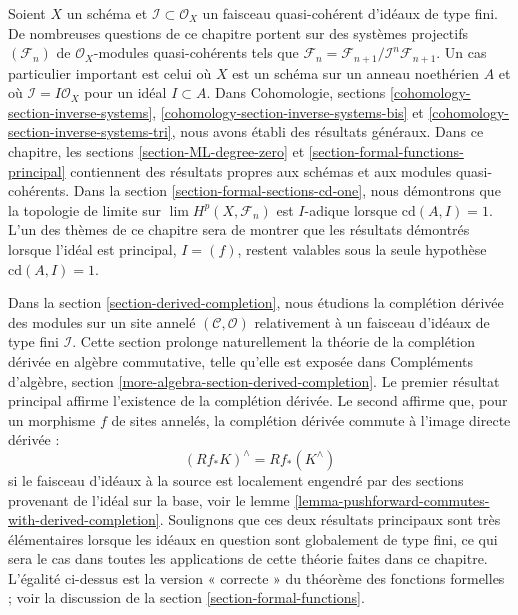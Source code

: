 \medskip\noindent
Soient $X$ un schéma et $\mathcal{I} \subset \mathcal{O}_X$
un faisceau quasi-cohérent d'idéaux de type fini. De nombreuses questions
de ce chapitre portent sur des systèmes projectifs $(\mathcal{F}_n)$
de $\mathcal{O}_X$-modules quasi-cohérents tels que
$\mathcal{F}_n = \mathcal{F}_{n + 1}/\mathcal{I}^n\mathcal{F}_{n + 1}$.
Un cas particulier important est celui où $X$ est un schéma sur un anneau
noethérien $A$ et où $\mathcal{I} = I \mathcal{O}_X$ pour un idéal $I \subset A$.
Dans Cohomologie, sections \ref{cohomology-section-inverse-systems},
\ref{cohomology-section-inverse-systems-bis} et
\ref{cohomology-section-inverse-systems-tri}, nous avons établi des résultats
généraux. Dans ce chapitre, les sections \ref{section-ML-degree-zero} et
\ref{section-formal-functions-principal} contiennent des résultats propres
aux schémas et aux modules quasi-cohérents. Dans la
section \ref{section-formal-sections-cd-one}, nous démontrons
que la topologie de limite sur $\lim H^p(X, \mathcal{F}_n)$ est $I$-adique
lorsque $\text{cd}(A, I) = 1$. L'un des thèmes
de ce chapitre sera de montrer que les résultats démontrés lorsque
l'idéal est principal, $I = (f)$,
restent valables sous la seule hypothèse $\text{cd}(A, I) = 1$.

\medskip\noindent
Dans la section \ref{section-derived-completion}, nous étudions la complétion dérivée
des modules sur un site annelé $(\mathcal{C}, \mathcal{O})$
relativement à un faisceau d'idéaux de type fini $\mathcal{I}$.
Cette section prolonge naturellement la théorie de la complétion dérivée
en algèbre commutative, telle qu'elle est exposée dans
Compléments d'algèbre, section \ref{more-algebra-section-derived-completion}.
Le premier résultat principal affirme l'existence de la complétion dérivée.
Le second affirme que, pour un morphisme $f$ de sites annelés,
la complétion dérivée commute à l'image directe dérivée :
$$
(Rf_*K)^\wedge = Rf_*(K^\wedge)
$$
si le faisceau d'idéaux à la source est localement engendré par des sections provenant
de l'idéal sur la base, voir le
lemme \ref{lemma-pushforward-commutes-with-derived-completion}.
Soulignons que ces deux résultats principaux sont très élémentaires lorsque
les idéaux en question sont globalement de type fini, ce qui sera
le cas dans toutes les applications de cette théorie faites dans ce chapitre.
L'égalité ci-dessus est la version « correcte » du
théorème des fonctions formelles ; voir la discussion de la
section \ref{section-formal-functions}.

